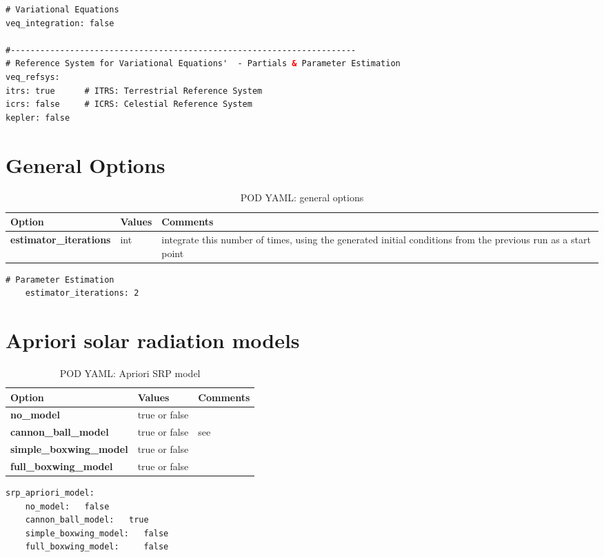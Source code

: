 \begin{lstlisting}[language=xml,caption=yaml example for variational equation options]
# Variational Equations
veq_integration: false

#----------------------------------------------------------------------
# Reference System for Variational Equations'  - Partials & Parameter Estimation
veq_refsys:
itrs: true      # ITRS: Terrestrial Reference System
icrs: false     # ICRS: Celestial Reference System
kepler: false
\end{lstlisting}

\section{General Options}
\begin{table}[h!]
	\begin{tabular}{|p{4.5cm}|p{2cm}|p{3.5cm}|}
		\hline
		Option & Values & Comments \\
		\hline
        \textbf{estimator\_iterations} & int & integrate this number of times, using the generated initial conditions from the previous run as a start point\\   
        \hline
	\end{tabular}
	\caption{POD YAML: general options}
	\label{table:pod_yaml_general_options}
\end{table}
%
\begin{lstlisting}[language=xml,caption=yaml example for output file options]
	# Parameter Estimation
	estimator_iterations: 2
\end{lstlisting}
%
\section{Apriori solar radiation models}   
%
\begin{table}[h!]
	\begin{tabular}{|p{4.5cm}|p{2cm}|p{3.5cm}|}
		\hline
		Option & Values & Comments \\
		\hline
		\textbf{no\_model}  & true or false & \\
		\textbf{cannon\_ball\_model} & true or false & see \nameref{sec:cannonball_srp}\\
		\textbf{simple\_boxwing\_model} & true or false & \\
		\textbf{full\_boxwing\_model} & true or false & \\
		\hline
	\end{tabular}
	\caption{POD YAML: Apriori SRP model}
	\label{table:pod_yaml_apriori_srp}
\end{table}
%
\begin{lstlisting}[language=xml,caption=yaml example for apriori srp model options]
srp_apriori_model:
	no_model:   false
	cannon_ball_model:   true
	simple_boxwing_model:   false
	full_boxwing_model:     false
\end{lstlisting}
%
